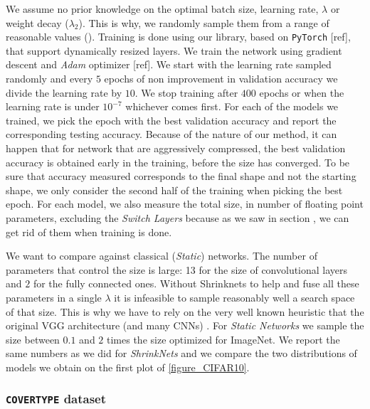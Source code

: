 We assume no prior knowledge on the optimal batch size, learning rate,
$\lambda$ or weight decay ($\lambda_2$). This is why, we randomly sample them
from a range of reasonable values ().
Training is done using our library, based on \texttt{PyTorch} [ref], that
support dynamically resized layers. We train the network using gradient descent
and \textit{Adam} optimizer [ref]. We start with the learning rate sampled
randomly and every $5$ epochs of non improvement in validation accuracy we
divide the learning rate by $10$. We stop training after $400$ epochs or when
the learning rate is under $10^{-7}$ whichever comes first. 
For each of the models we trained, we pick the epoch with the best validation
accuracy and report the corresponding testing accuracy. Because of the nature of
our method, it can happen that for network that are aggressively compressed, the
best validation accuracy is obtained early in the training, before the size has
converged. To be sure that accuracy measured corresponds to the final shape and
not the starting shape, we only consider the second half of the training when
picking the best epoch. For each model, we also measure the total size, in
number of floating point parameters, excluding the \textit{Switch Layers}
because as we saw in section , we can get rid of them when
training is done.

We want to compare against classical (\textit{Static}) networks. The number of
parameters that control the size is large: 13 for the size of convolutional
layers and $2$ for the fully connected ones. Without Shrinknets to help and fuse
all these parameters in a single $\lambda$ it is infeasible to sample reasonably
well a search space of that size. This is why we have to rely on the very well
known heuristic that the original VGG architecture (and many CNNs) . For \textit{Static Networks}
we sample the size between $0.1$ and $2$ times the size optimized for ImageNet.
We report the same numbers as we did for \textit{ShrinkNets} and we compare the
two distributions of models we obtain on the first plot of \cref{figure_CIFAR10}.


\subsubsection{\texttt{COVERTYPE} dataset}

